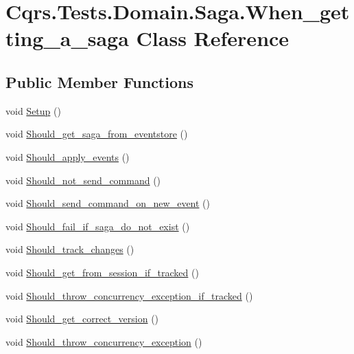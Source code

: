 \hypertarget{classCqrs_1_1Tests_1_1Domain_1_1Saga_1_1When__getting__a__saga}{}\section{Cqrs.\+Tests.\+Domain.\+Saga.\+When\+\_\+getting\+\_\+a\+\_\+saga Class Reference}
\label{classCqrs_1_1Tests_1_1Domain_1_1Saga_1_1When__getting__a__saga}
\subsection*{Public Member Functions}
\begin{DoxyCompactItemize}
\item 
void \hyperlink{classCqrs_1_1Tests_1_1Domain_1_1Saga_1_1When__getting__a__saga_ad01cf3fdca0367e26a5529c1158f8b41}{Setup} ()
\item 
void \hyperlink{classCqrs_1_1Tests_1_1Domain_1_1Saga_1_1When__getting__a__saga_a322ca7de7793e731f2d2d39fcae12b1a}{Should\+\_\+get\+\_\+saga\+\_\+from\+\_\+eventstore} ()
\item 
void \hyperlink{classCqrs_1_1Tests_1_1Domain_1_1Saga_1_1When__getting__a__saga_a33c41340c5049e3e9a1be0c3eb3ae8c1}{Should\+\_\+apply\+\_\+events} ()
\item 
void \hyperlink{classCqrs_1_1Tests_1_1Domain_1_1Saga_1_1When__getting__a__saga_ac3706bb8233efa4d428ab3f282c1d61d}{Should\+\_\+not\+\_\+send\+\_\+command} ()
\item 
void \hyperlink{classCqrs_1_1Tests_1_1Domain_1_1Saga_1_1When__getting__a__saga_a2b7a480fc7b5dca8f1bd105bda0d130c}{Should\+\_\+send\+\_\+command\+\_\+on\+\_\+new\+\_\+event} ()
\item 
void \hyperlink{classCqrs_1_1Tests_1_1Domain_1_1Saga_1_1When__getting__a__saga_afb09f2b59a54e698723fce8d1171c6c7}{Should\+\_\+fail\+\_\+if\+\_\+saga\+\_\+do\+\_\+not\+\_\+exist} ()
\item 
void \hyperlink{classCqrs_1_1Tests_1_1Domain_1_1Saga_1_1When__getting__a__saga_ab99df993d199a3cebe52c546bbb39bf0}{Should\+\_\+track\+\_\+changes} ()
\item 
void \hyperlink{classCqrs_1_1Tests_1_1Domain_1_1Saga_1_1When__getting__a__saga_a9be27ce999d88a72caa898836e3670e5}{Should\+\_\+get\+\_\+from\+\_\+session\+\_\+if\+\_\+tracked} ()
\item 
void \hyperlink{classCqrs_1_1Tests_1_1Domain_1_1Saga_1_1When__getting__a__saga_a1ae0ff5cca5132ef242a26c2485c6648}{Should\+\_\+throw\+\_\+concurrency\+\_\+exception\+\_\+if\+\_\+tracked} ()
\item 
void \hyperlink{classCqrs_1_1Tests_1_1Domain_1_1Saga_1_1When__getting__a__saga_aadae2b84d67626fc8740e74a89617250}{Should\+\_\+get\+\_\+correct\+\_\+version} ()
\item 
void \hyperlink{classCqrs_1_1Tests_1_1Domain_1_1Saga_1_1When__getting__a__saga_afb825714d424b2c24ef89ec6d457b323}{Should\+\_\+throw\+\_\+concurrency\+\_\+exception} ()
\end{DoxyCompactItemize}


